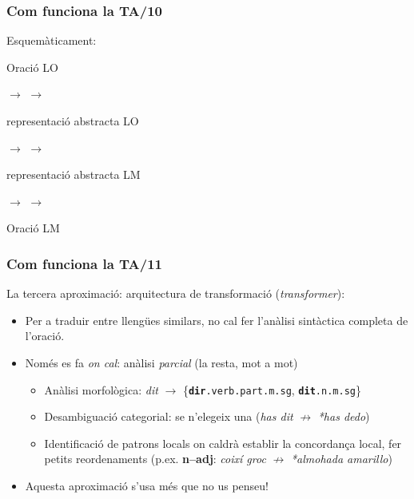 \documentclass{beamer}
\newcommand{\empha}[1]{\emph{#1}\/}
\begin{document}
\begin{frame}
  \frametitle{Com funciona la TA/10}
Esquemàticament:
\begin{small}
\begin{center}
\parbox{1.0cm}{Oració LO} $\to$
 $\to$ 
\parbox{1.0cm}{repre\-senta\-ció abs\-tracta LO} $\to$
 $\to$
\parbox{1.0cm}{repre\-senta\-ció abs\-tracta LM} $\to$
 $\to$
\parbox{1.0cm}{Oració LM} 
\end{center}
  \end{small}

\end{frame}

\begin{frame}
  \frametitle{Com funciona la TA/11}

  La tercera aproximació: arquitectura de transformació
  (\empha{transformer}):

  \begin{itemize}
  \item Per a traduir entre llengües similars, no cal fer l'anàlisi sintàctica completa de l'oració.
  \item Només es fa \empha{on cal}: anàlisi \empha{parcial} (la resta, mot a mot)
    \begin{itemize}
    \item Anàlisi morfològica: \empha{dit} \(\to\) \{\texttt{\textbf{dir}.verb.part.m.sg}, \texttt{\textbf{dit}.n.m.sg}\}
    \item Desambiguació categorial: se n'elegeix una (\empha{has dit} \(\not\to\) \empha{*has dedo})
    \item Identificació de patrons locals on caldrà establir la
      concordança local, fer petits reordenaments (p.ex. \textbf{n--adj}: \empha{coixí groc} \(\not\to\) \empha{*almohada amarillo})
    \end{itemize}
  \item Aquesta aproximació s'usa més que no us penseu!
  \end{itemize}

\end{frame}
\end{document}
